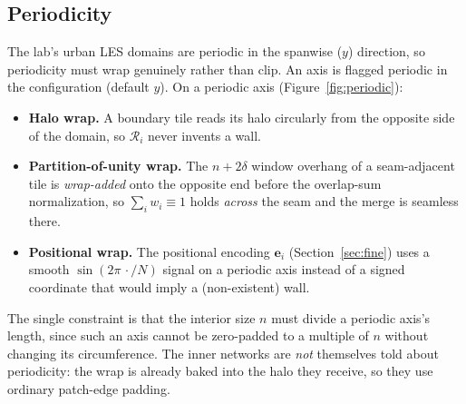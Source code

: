 \documentclass[11pt]{article}
\newcommand{\Rop}{\mathcal{R}}
\begin{document}
\subsection{Periodicity}\label{sec:periodic}

The lab's urban LES domains are periodic in the spanwise ($y$) direction, so
periodicity must wrap genuinely rather than clip. An axis is flagged periodic in the
configuration (default $y$). On a periodic axis (Figure~\ref{fig:periodic}):
\begin{itemize}
\item \textbf{Halo wrap.} A boundary tile reads its halo circularly from the
opposite side of the domain, so $\Rop_i$ never invents a wall.
\item \textbf{Partition-of-unity wrap.} The $n+2\delta$ window overhang of a
seam-adjacent tile is \emph{wrap-added} onto the opposite end before the overlap-sum
normalization, so $\sum_i w_i\equiv1$ holds \emph{across} the seam and the merge is
seamless there.
\item \textbf{Positional wrap.} The positional encoding $\bm e_i$
(Section~\ref{sec:fine}) uses a smooth $\sin(2\pi\,\cdot/N)$ signal on a periodic
axis instead of a signed coordinate that would imply a (non-existent) wall.
\end{itemize}
The single constraint is that the interior size $n$ must divide a periodic axis's
length, since such an axis cannot be zero-padded to a multiple of $n$ without
changing its circumference. The inner networks are \emph{not} themselves told about
periodicity: the wrap is already baked into the halo they receive, so they use
ordinary patch-edge padding.
\end{document}
